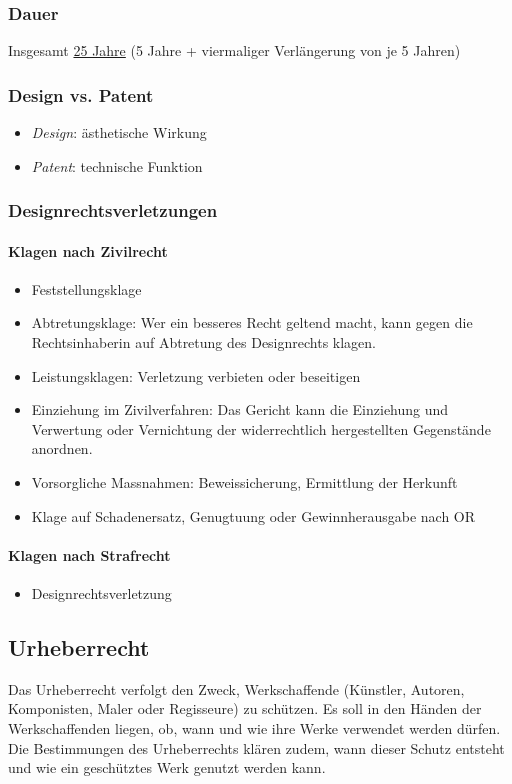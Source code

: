 \subsubsection{Dauer}
Insgesamt \underline{25 Jahre} (5 Jahre + viermaliger Verlängerung von je 5 Jahren)

\subsubsection{Design vs. Patent}
\begin{itemize}
    \item \textit{Design}: ästhetische Wirkung
    \item \textit{Patent}: technische Funktion
\end{itemize}

\subsubsection{Designrechtsverletzungen}
\paragraph{Klagen nach Zivilrecht}
\begin{itemize}
    \item Feststellungsklage
    \item Abtretungsklage: Wer ein besseres Recht geltend macht, kann gegen die Rechtsinhaberin auf Abtretung des Designrechts klagen.
    \item Leistungsklagen: Verletzung verbieten oder beseitigen
    \item Einziehung im Zivilverfahren: Das Gericht kann die Einziehung und Verwertung oder Vernichtung der widerrechtlich hergestellten Gegenstände anordnen.
    \item Vorsorgliche Massnahmen: Beweissicherung, Ermittlung der Herkunft
    \item Klage auf Schadenersatz, Genugtuung oder Gewinnherausgabe nach OR
\end{itemize}

\paragraph{Klagen nach Strafrecht}
\begin{itemize}
    \item Designrechtsverletzung
\end{itemize}

\subsection{Urheberrecht}
Das Urheberrecht verfolgt den Zweck, Werkschaffende (Künstler, Autoren, Komponisten, Maler oder Regisseure) zu schützen. Es soll in den Händen der Werkschaffenden liegen, ob, wann und wie ihre Werke verwendet werden dürfen. Die Bestimmungen des Urheberrechts klären zudem, wann dieser Schutz entsteht und wie ein geschütztes Werk genutzt werden kann.

